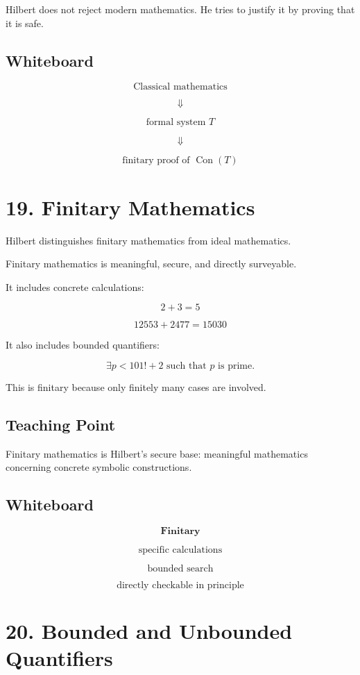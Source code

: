 \documentclass[11pt]{article}
\begin{document}
Hilbert does not reject modern mathematics. He tries to justify it by proving that it is
safe.

\subsection*{Whiteboard}

\[
\text{Classical mathematics}
\]

\[
\Downarrow
\]

\[
\text{formal system }T
\]

\[
\Downarrow
\]

\[
\text{finitary proof of } \operatorname{Con}(T)
\]

\section*{19. Finitary Mathematics}

Hilbert distinguishes finitary mathematics from ideal mathematics.

Finitary mathematics is meaningful, secure, and directly surveyable.

It includes concrete calculations:

\[
2+3=5
\]

\[
12553+2477=15030
\]

It also includes bounded quantifiers:

\[
\exists p<101!+2 \text{ such that } p \text{ is prime.}
\]

This is finitary because only finitely many cases are involved.

\subsection*{Teaching Point}

Finitary mathematics is Hilbert's secure base: meaningful mathematics concerning
concrete symbolic constructions.

\subsection*{Whiteboard}

\[
\textbf{Finitary}
\]

\[
\text{specific calculations}
\]

\[
\text{bounded search}
\]

\[
\text{directly checkable in principle}
\]

\section*{20. Bounded and Unbounded Quantifiers}
\end{document}
